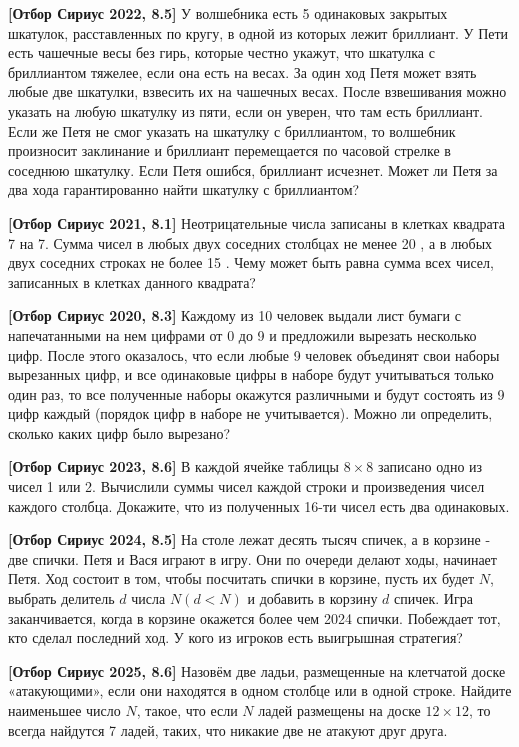 \textbf{[Отбор Сириус 2022, 8.5]}
У волшебника есть 5 одинаковых закрытых шкатулок, расставленных по кругу, в одной из которых лежит бриллиант. У Пети есть чашечные весы без гирь, которые честно укажут, что шкатулка с бриллиантом тяжелее, если она есть на весах. За один ход Петя может взять любые две шкатулки, взвесить их на чашечных весах. После взвешивания можно указать на любую шкатулку из пяти, если он уверен, что там есть бриллиант. Если же Петя не смог указать на шкатулку с бриллиантом, то волшебник произносит заклинание и бриллиант перемещается по часовой стрелке в соседнюю шкатулку. Если Петя ошибся, бриллиант исчезнет. Может ли Петя за два хода гарантированно найти шкатулку с бриллиантом?

\textbf{[Отбор Сириус 2021, 8.1]}
Неотрицательные числа записаны в клетках квадрата 7 на 7. Сумма чисел в любых двух соседних столбцах не менее 20 , а в любых двух соседних строках не более 15 . Чему может быть равна сумма всех чисел, записанных в клетках данного квадрата?

\textbf{[Отбор Сириус 2020, 8.3]}
Каждому из 10 человек выдали лист бумаги с напечатанными на нем цифрами от 0 до 9 и предложили вырезать несколько цифр. После этого оказалось, что если любые 9 человек объединят свои наборы вырезанных цифр, и все одинаковые цифры в наборе будут учитываться только один раз, то все полученные наборы окажутся различными и будут состоять из 9 цифр каждый (порядок цифр в наборе не учитывается). Можно ли определить, сколько каких цифр было вырезано?

\textbf{[Отбор Сириус 2023, 8.6]}
В каждой ячейке таблицы $8 \times 8$ записано одно из чисел 1 или 2. Вычислили суммы чисел каждой строки и произведения чисел каждого столбца. Докажите, что из полученных 16-ти чисел есть два одинаковых.


\textbf{[Отбор Сириус 2024, 8.5]}
На столе лежат десять тысяч спичек, а в корзине - две спички. Петя и Вася играют в игру. Они по очереди делают ходы, начинает Петя. Ход состоит в том, чтобы посчитать спички в корзине, пусть их будет $N$, выбрать делитель $d$ числа $N(d<N)$ и добавить в корзину $d$ спичек. Игра заканчивается, когда в корзине окажется более чем 2024 спички. Побеждает тот, кто сделал последний ход. У кого из игроков есть выигрышная стратегия?

\textbf{[Отбор Сириус 2025, 8.6]}
Назовём две ладьи, размещенные на клетчатой доске «атакующими», если они находятся в одном столбце или в одной строке. Найдите наименьшее число $N$, такое, что если $N$ ладей размещены на доске $12 \times 12$, то всегда найдутся 7 ладей, таких, что никакие две не атакуют друг друга.